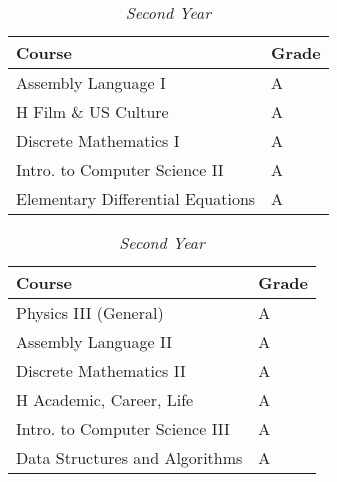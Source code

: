 \documentclass[12pt]{article}
\renewcommand{\it}[1]{\textit{{#1}}}
\begin{document}
\begin{table}[H]
  \centering
  \vspace{-0.8em}
  \caption*{\it{Second Year}}
  \begin{tabular}{l|l}
    Course                             & Grade \\
    \hline
    Assembly Language I                & A \\
    H Film \& US Culture               & A \\
    Discrete Mathematics I             & A \\
    Intro. to Computer Science II      & A \\
    Elementary Differential Equations  & A \\


  \end{tabular}
  \hfill
  \begin{tabular}{l|l}
    Course                         & Grade \\
    \hline
    Physics III (General)          & A \\
    Assembly Language II           & A \\
    Discrete Mathematics II        & A \\
    H Academic, Career, Life       & A \\
    Intro. to Computer Science III & A \\
    Data Structures and Algorithms & A \\
  \end{tabular}
\end{table}
\end{document}

